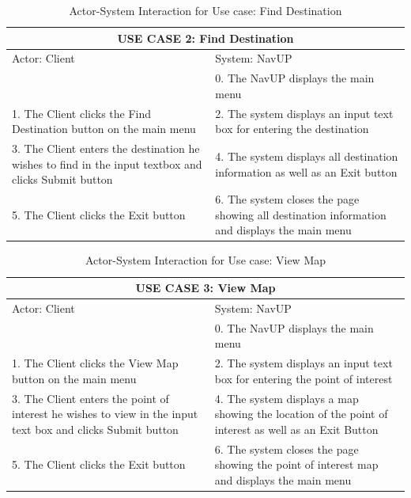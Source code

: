 \documentclass[a4paper,10pt]{article}
\begin{document}
\begin{enumerate}
\begin{table}[h!]
\centering
\begin {tabular}{ |p{6cm}||p{6cm}|}
\hline
\multicolumn{2}{|c|}{USE CASE 2: Find Destination }\\
\hline
Actor: Client&System: NavUP\\
\hline
&0. The NavUP displays the main menu\\
1. The Client clicks the Find Destination button on the main menu &2. The system displays an input text box for entering the destination\\
3. The Client enters the destination he wishes to find in the input textbox and clicks Submit button &4. The system displays all destination information as well as an Exit button\\
5. The Client clicks the Exit button &6. The system closes the page showing all destination information and displays the main menu\\
\hline
\end {tabular}
\caption{Actor-System Interaction for Use case: Find Destination} 
\end {table}


\begin{table}[h!]
\centering
\begin {tabular}{ |p{6cm}||p{6cm}|}
\hline
\multicolumn{2}{|c|}{USE CASE 3: View Map }\\
\hline
Actor: Client&System: NavUP\\
\hline
&0. The NavUP displays the main menu\\
1. The Client clicks the View Map button on the main menu &2. The system displays an input text box for entering the point of interest\\
3. The Client enters the point of interest  he wishes to view in the input text box and clicks Submit button &4. The system displays a map showing the location of the point of interest as well as an Exit Button\\
5. The Client clicks the Exit button &6. The system closes the page showing the point of interest map and displays the main menu\\
\hline
\end {tabular}
\caption{Actor-System Interaction for Use case: View Map} 
\end {table}
 

\end{enumerate}
\end{document}
